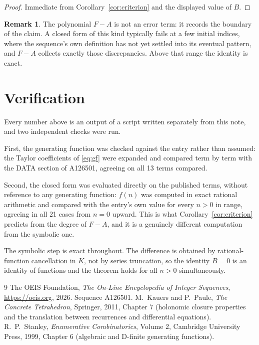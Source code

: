 \documentclass[11pt,a4paper]{article}
\theoremstyle{plain}
\theoremstyle{definition}
\newtheorem{remark}[theorem]{Remark}
\begin{document}
\begin{proof}
Immediate from Corollary~\ref{cor:criterion} and the displayed value of $B$.
\end{proof}

\begin{remark}
The polynomial $F-A$ is not an error term: it records the boundary of the claim. A closed
form of this kind typically fails at a few initial indices, where the sequence's own
definition has not yet settled into its eventual pattern, and $F-A$ collects exactly
those discrepancies. Above that range the identity is exact.
\end{remark}

\section{Verification}

Every number above is an output of a script written separately from this note, and two
independent checks were run.

First, the generating function was checked against the entry rather than assumed: the
Taylor coefficients of \eqref{eq:gf} were expanded and compared term by term with the DATA
section of A126501, agreeing on all 13 terms compared.

Second, the closed form was evaluated directly on the published terms, without reference
to any generating function: $f(n)$ was computed in exact rational arithmetic and compared
with the entry's own value for every $n>0$ in range, agreeing in all 21 cases
from $n=0$ upward. This is what Corollary~\ref{cor:criterion} predicts from the
degree of $F-A$, and it is a genuinely different computation from the symbolic one.

The symbolic step is exact throughout. The difference is obtained by rational-function
cancellation in $K$, not by series truncation, so the identity $B=0$ is an
identity of functions and the theorem holds for all $n>0$ simultaneously.

\begin{thebibliography}{9}
 The OEIS Foundation, \emph{The On-Line Encyclopedia of Integer Sequences},
\url{https://oeis.org}, 2026. Sequence A126501.
 M.~Kauers and P.~Paule, \emph{The Concrete Tetrahedron}, Springer, 2011,
Chapter 7 (holonomic closure properties and the translation between recurrences and
differential equations).
 R.~P.~Stanley, \emph{Enumerative Combinatorics}, Volume 2, Cambridge
University Press, 1999, Chapter 6 (algebraic and D-finite generating functions).
\end{thebibliography}
\end{document}
